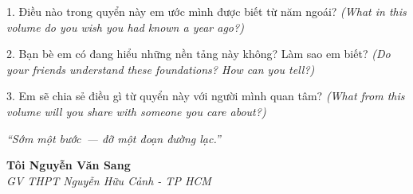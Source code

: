 \begin{tuhocnhanh}
1. Điều nào trong quyển này em ước mình được biết từ năm ngoái? \textit{(What in this volume do you wish you had known a year ago?)}

2. Bạn bè em có đang hiểu những nền tảng này không? Làm sao em biết? \textit{(Do your friends understand these foundations? How can you tell?)}

3. Em sẽ chia sẻ điều gì từ quyển này với người mình quan tâm? \textit{(What from this volume will you share with someone you care about?)}
\end{tuhocnhanh}

\begin{center}
\textit{\color{warmgold}``Sớm một bước~--- đỡ một đoạn đường lạc.''}
\end{center}

\begin{flushright}
\textbf{Tôi Nguyễn Văn Sang}\\
\textit{GV THPT Nguyễn Hữu Cảnh - TP HCM}
\end{flushright}

\ngancach
